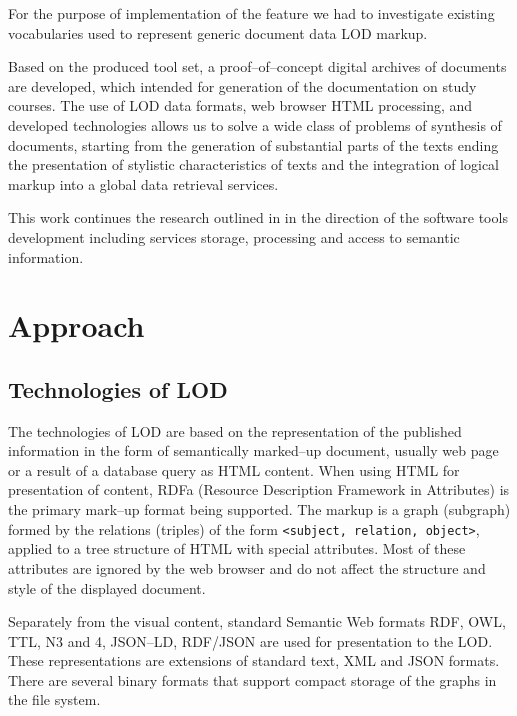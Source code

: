 \documentclass[conference,a4paper]{IEEEtran}
\begin{document}
For the purpose of implementation of the feature we had to investigate existing
vocabularies used to represent generic document data LOD markup.


Based on the produced tool set, a proof--of--concept digital archives of
documents are
developed, which intended for generation of the documentation on study
courses. The use of LOD data formats, web browser HTML processing, and
developed technologies allows us to solve a wide class of problems of
synthesis of documents, starting from the generation of substantial
parts of the texts ending the presentation of stylistic characteristics
of texts and the integration of logical markup into a global data
retrieval services.

This work continues the research outlined in \cite{b2} in the direction of
the software tools development including services storage, processing
and access to semantic information.

\section{Approach}
\subsection{Technologies of LOD}

The technologies of LOD are based on the representation of the published
information in the form of semantically marked--up document, usually web
page or a result of a database query as HTML content. When using HTML
for presentation of content, RDFa (Resource Description Framework in
Attributes) is the primary mark--up format being supported. The markup is
a graph (subgraph) formed by the relations (triples) of the form
\texttt{<subject, relation, object>}, applied to a tree
structure of HTML with special attributes. Most of these attributes are
ignored by the web browser and do not affect the structure and style of
the displayed document.

Separately from the visual content, standard Semantic Web formats RDF,
OWL, TTL, N3 and 4, JSON--LD, RDF/JSON are used for presentation to the
LOD. These representations are extensions of standard text, XML and JSON
formats. There are several binary formats that support compact storage
of the graphs in the file system.
\end{document}
